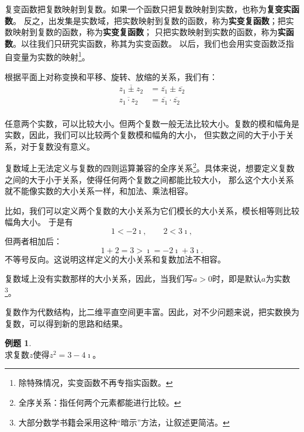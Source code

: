 \documentclass[12pt,UTF8]{ctexbook}
\theoremstyle{definition}
\newtheorem{et}{例题}[section]
\theoremstyle{plain}
\begin{document}
复变函数把复数映射到复数。如果一个函数只把复数映射到实数，也称为\textbf{复变实函数}。
反之，出发集是实数域，把实数映射到复数的函数，称为\textbf{实变复函数}；把实数映射到复数的函数，称为\textbf{实变复函数}；
只把实数映射到实数的函数，称为\textbf{实函数}。以往我们只研究实函数，称其为实变函数。
以后，我们也会用实变函数泛指自变量为实数的映射\footnote{除特殊情况，实变函数不再专指实函数。}。

根据平面上对称变换和平移、旋转、放缩的关系，我们有：
\begin{align*}
    \overline{z_1 \pm z_2} &= \overline{z_1} \pm \overline{z_2} \\
    \overline{z_1 \cdot z_2} &= \overline{z_1} \cdot \overline{z_2} \\
\end{align*}

任意两个实数，可以比较大小。但两个复数一般无法比较大小。复数的模和幅角是实数，因此，我们可以比较两个复数模和幅角的大小，
但实数之间的大于小于关系，对于复数没有意义。

复数域上无法定义与复数的四则运算兼容的全序关系\footnote{全序关系：指任何两个元素都能进行比较。}。具体来说，想要定义复数之间的大于小于关系，使得任何两个复数之间都能比较大小，
那么这个大小关系就不能像实数的大小关系一样，和加法、乘法相容。

比如，我们可以定义两个复数的大小关系为它们模长的大小关系，模长相等则比较幅角大小。
于是有
$$1 < -2\imath, \qquad 2 < 3\imath,$$
但两者相加后：
$$ 1 + 2 = 3 > \imath = -2\imath + 3\imath.$$
不等号反向。这说明这样定义的大小关系和复数加法不相容。

复数域上没有实数那样的大小关系，因此，当我们写$a > 0$时，即是默认$a$为实数\footnote{大部分数学书籍会采用这种“暗示”方法，让叙述更简洁。}。

复数作为代数结构，比二维平直空间更丰富。因此，对不少问题来说，把实数换为复数，可以得到新的思路和结果。

\begin{et}
    \mbox{} \\
    求复数$z$使得$z^2 = 3 - 4\imath$。
\end{et}
\end{document}
